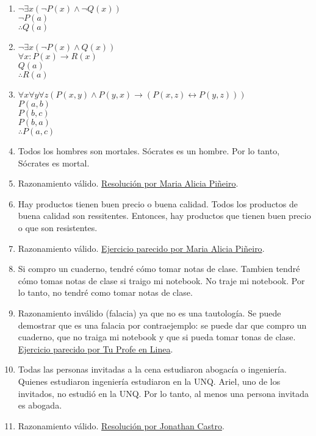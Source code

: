 \documentclass[a4paper]{article}
\newcommand{\answer}{\item[**]}
\newcommand{\then}{\to}
\newcommand{\eq}{\leftrightarrow}
\begin{document}
\begin{enumerate}
\begin{enumerate} [label=(\alph*)]
		\item $\neg \exists x ( \neg P(x) \land  \neg Q(x) )$ \\
			$\neg P(a)$ \\
			$\therefore Q(a)$

		\item $\neg \exists x ( \neg P(x) \land  Q(x) )$ \\
			$\forall x:  P(x) \then  R(x)$ \\
			$Q(a)$ \\
			$\therefore R(a)$

		\item $\forall x\forall y\forall z ( P(x,y)\land P(y,x) \then  (P(x,z)\eq P(y,z)) )$ \\
			$P(a,b)$ \\
			$P(b,c)$ \\
			$P(b,a)$ \\
			$\therefore P(a,c)$

		\item Todos los hombres son mortales. Sócrates es un hombre. Por lo tanto, Sócrates es mortal.
		\answer Razonamiento válido. \href{https://youtu.be/PtjWjkc5txI}{Resolución por Maria Alicia Piñeiro}.

		\item Hay productos tienen buen precio o buena calidad. Todos los productos de buena calidad son ressitentes. Entonces, hay productos que tienen buen precio o que son resistentes. 
		\answer Razonamiento válido. \href{https://youtu.be/PtjWjkc5txI?t=328}{Ejercicio parecido por Maria Alicia Piñeiro}.

		\item Si compro un cuaderno, tendré cómo tomar notas de clase. Tambien tendré cómo tomas notas de clase si traigo mi notebook. No traje mi notebook. Por lo tanto, no tendré como tomar notas de clase. 
		\answer Razonamiento inválido (falacia) ya que no es una tautología. Se puede demostrar que es una falacia por contraejemplo: se puede dar que compro un cuaderno, que no traiga mi notebook y que si pueda tomar tonas de clase. \href{https://youtu.be/r8MlTVDzgwg}{Ejercicio parecido por Tu Profe en Linea}.

		\item Todas las personas invitadas a la cena estudiaron abogacía o ingeniería. Quienes estudiaron ingeniería estudiaron en la UNQ. Ariel, uno de los invitados, no estudió en la UNQ. Por lo tanto, al menos una persona invitada es abogada.  
		\answer Razonamiento válido. \href{https://youtu.be/AMDgepP_N_A}{Resolución por Jonathan Castro}.


\end{enumerate}
\end{enumerate}
\end{document}
